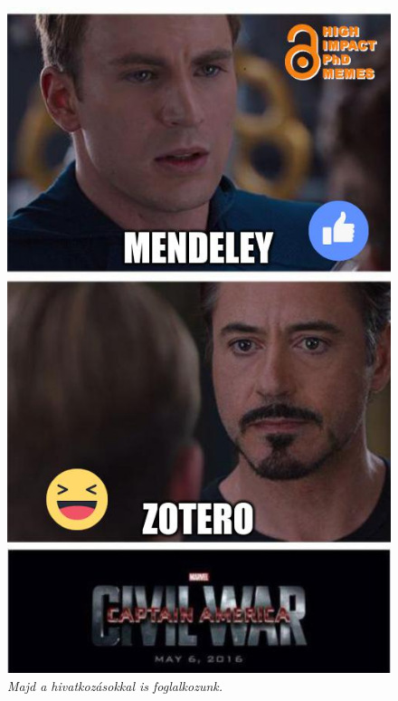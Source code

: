 \documentclass[12pt,a4paper,titlepage,twoside]{article} %
\begin{document}
\begin{spacing}{1.5}
\begin{figure}[ptbh]
	\centering
	\includegraphics[scale=0.5]{figs/73040522_2454641708113478_5235417163610718208_n.jpg}
	\caption{\textit{Majd a hivatkozásokkal is foglalkozunk.}}
	\label{fig:references}
\end{figure}


\end{spacing}
\end{document}
